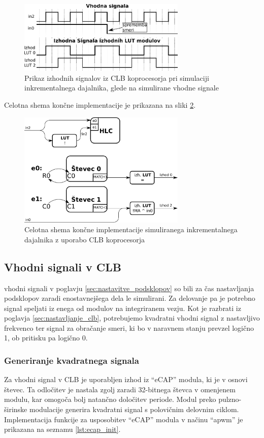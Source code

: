 \documentclass[a4paper]{article}
\begin{document}
\begin{sloppypar}
\begin{figure}[htb]
    \centerline{\includegraphics[width=8cm]{obracanje_smeri_potek}}
    \caption{Prikaz izhodnih signalov iz CLB koprocesorja pri simulaciji 
             inkrementalnega dajalnika, glede na simulirane vhodne signale}
    \label{fig:obracanje_smeri}
\end{figure}

Celotna shema končne implementacije je prikazana na sliki
\ref{fig:koncna_shema}.

\begin{figure}[htb]
    \centerline{\includegraphics[width=8cm]{koncna_shema}}
    \caption{Celotna shema končne implementacije simuliranega inkrementalnega
             dajalnika z uporabo CLB koprocesorja}
    \label{fig:koncna_shema}
\end{figure}

\subsection{Vhodni signali v CLB}
vhodni signali v poglavju \ref{sec:nastavitve_podsklopov} so bili za čas
nastavljanja podsklopov zaradi enostavnejšega dela le simulirani. Za delovanje
pa je potrebno signal speljati iz enega od modulov na integriranem vezju. Kot
je razbrati iz poglavja \ref{sec:nastavljanje_clb}, potrebujemo kvadratni
vhodni signal z nastavljivo frekvenco ter signal za obračanje smeri, ki bo v
naravnem stanju prevzel logično 1, ob pritisku pa logično 0.

\subsubsection{Generiranje kvadratnega signala}
Za vhodni signal v CLB je uporabljen izhod iz ``eCAP'' modula, ki je v osnovi
števec. Ta odločitev je nastala zgolj zaradi 32-bitnega števca v omenjenem
modulu, kar omogoča bolj natančno določitev periode. Modul preko
pulzno-širinske modulacije generira kvadratni signal s polovičnim delovnim
ciklom. Implementacija funkcije za usposobitev ``eCAP'' modula v načinu
``apwm'' je prikazana na seznamu \ref{lst:ecap_init}.


\end{sloppypar}
\end{document}
